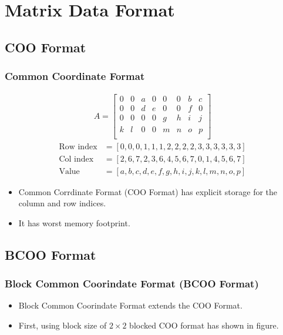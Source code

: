 \section{Matrix Data Format}

\subsection{COO Format}
\begin{frame}
    \frametitle{Common Coordinate Format}
	\begin{align*}
		A = \begin{bmatrix}
			0 & 0 & a & 0 & 0 & 0 & b & c \\
			0 & 0 & d & e & 0 & 0 & f & 0 \\
			0 & 0 & 0 & 0 & g & h & i & j \\
			k & l & 0 & 0 & m & n & o & p \\
		\end{bmatrix}
	\end{align*}
	\begin{align*}
		\text{Row index} &= [0, 0, 0, 1, 1, 1, 2, 2, 2, 2, 3, 3, 3, 3, 3, 3] \\
		\text{Col index} &= [2, 6, 7, 2, 3, 6, 4, 5, 6, 7, 0, 1, 4, 5, 6, 7] \\
		\text{Value}     &= [a, b, c, d, e, f, g, h, i, j, k, l, m, n, o, p]
	\end{align*}
    \begin{itemize}
    	\item
    		Common Corrdinate Format (COO Format) has explicit storage for the
    		column and row indices.
    	\item 
    		It has worst memory footprint.
    \end{itemize}	
\end{frame}

\subsection{BCOO Format}
\begin{frame}
	\frametitle{Block Common Coorindate Format (BCOO Format)}
	\begin{itemize}
		\item Block Common Coorindate Format extends the COO Format.
		\item First, using block size of $2 \times 2$ blocked COO format has 
			shown in figure.
	\end{itemize}
	
\end{frame}

